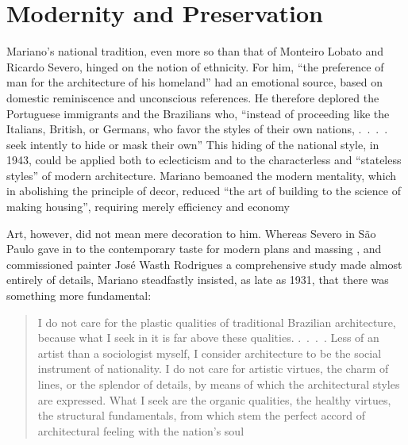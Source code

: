 \hypertarget{modernity-and-preservation}{%
\section{Modernity and Preservation}\label{modernity-and-preservation}}

Mariano's national tradition, even more so than that of Monteiro Lobato
and Ricardo Severo, hinged on the notion of ethnicity. For him, ``the
preference of man for the architecture of his homeland'' had an
emotional source, based on domestic reminiscence and unconscious
references. He therefore deplored the Portuguese immigrants and the
Brazilians who, ``instead of proceeding like the Italians, British, or
Germans, who favor the styles of their own nations, .~.~.~. seek
intently to hide or mask their own''
\autocite[p.~32]{mariannofilho:1943margem} This hiding of the national
style, in 1943, could be applied both to eclecticism and to the
characterless and ``stateless styles'' of modern architecture. Mariano
bemoaned the modern mentality, which in abolishing the principle of
decor, reduced ``the art of building to the science of making housing'',
requiring merely efficiency and economy
\autocite[p.~15]{mariannofilho:1943margem}

Art, however, did not mean mere decoration to him. Whereas Severo in São
Paulo gave in to the contemporary taste for modern plans and massing
\autocite[p.~178]{mello:2007ricardo}, and commissioned painter José
Wasth Rodrigues a comprehensive study made almost entirely of details,
Mariano steadfastly insisted, as late as 1931, that there was something
more fundamental:

\begin{quote}
I do not care for the plastic qualities of traditional Brazilian
architecture, because what I seek in it is far above these qualities.
.~.~.~. Less of an artist than a sociologist myself, I consider
architecture to be the social instrument of nationality. I do not care
for artistic virtues, the charm of lines, or the splendor of details, by
means of which the architectural styles are expressed. What I seek are
the organic qualities, the healthy virtues, the structural fundamentals,
from which stem the perfect accord of architectural feeling with the
nation's soul \autocite[p.~64]{mariannofilho:1943margem}
\end{quote}

